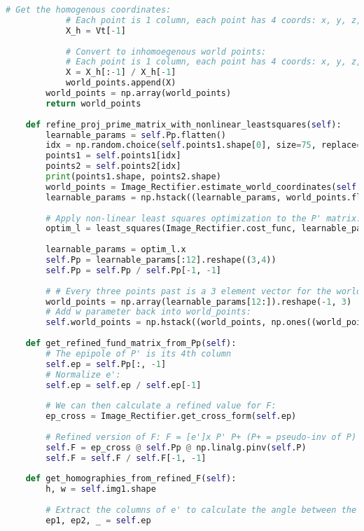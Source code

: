\documentclass{article}
\begin{document}
\begin{lstlisting}[language=Python]
            # Get the homogenous coordinates:
            # Each point is 1 column, each point has 4 coords: x, y, z, w
            X_h = Vt[-1]
            
            # Convert to inhomoegenous world points:
            # Each point is 1 column, each point has 4 coords: x, y, z, 1
            X = X_h[:-1] / X_h[-1]
            world_points.append(X)
        world_points = np.array(world_points)
        return world_points
    
    def refine_proj_prime_matrix_with_nonlinear_leastsquares(self):
        learnable_params = self.Pp.flatten()
        idx = np.random.choice(self.points1.shape[0], size=75, replace=False)
        points1 = self.points1[idx]
        points2 = self.points2[idx]
        print(points1.shape, points2.shape)
        world_points = Image_Rectifier.estimate_world_coordinates(self.P, self.Pp, points1, points2)
        learnable_params = np.hstack((learnable_params, world_points.flatten()))
        
        # Apply non-linear least squares optimization to the P' matrix:
        optim_l = least_squares(Image_Rectifier.cost_func, learnable_params, args=(points1,points2, False), method='lm', verbose=2)
        
        learnable_params = optim_l.x
        self.Pp = learnable_params[:12].reshape((3,4))
        self.Pp = self.Pp / self.Pp[-1, -1]
        
        # # Every three points past is a 3 element vector for the world points;
        world_points = np.array(learnable_params[12:]).reshape(-1, 3)
        # Add w parameter back into world_points:
        self.world_points = np.hstack((world_points, np.ones((world_points.shape[0], 1))))
        
    def get_refined_fund_matrix_from_Pp(self):
        # The epipole of P' is its 4th column
        self.ep = self.Pp[:, -1]
        # Normalize e':
        self.ep = self.ep / self.ep[-1]
        
        # We can then calculate a refined value for F:
        ep_cross = Image_Rectifier.get_cross_form(self.ep)
        
        # Refined version of F: F = [e']x P' P+ (P+ = pseudo-inv of P)
        self.F = ep_cross @ self.Pp @ np.linalg.pinv(self.P)
        self.F = self.F / self.F[-1, -1]
        
    def get_homographies_from_refined_F(self):
        h, w = self.img1.shape
        
        # Extract the columns of e' to calculate the angle between the components of e'
        ep1, ep2, _ = self.ep
        

\end{lstlisting}
\end{document}
